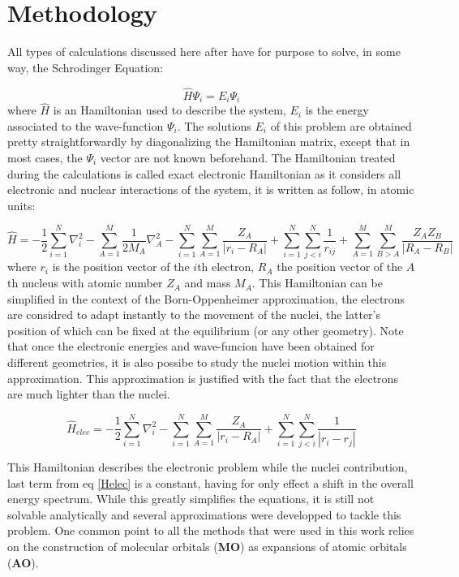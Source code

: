\documentclass[10pt]{report}
\numberwithin{equation}{section}
\begin{document}
\section{Methodology}

All types of calculations discussed here after have for purpose to solve, in some way, the Schrodinger Equation:

\begin{equation}
    \hat{H}\Psi_i=E_i\Psi_i
\end{equation}
where $\hat{H}$ is an Hamiltonian used to describe the system, $E_i$ is the energy associated to the wave-function $\Psi_i$. 
The solutions $E_i$ of this problem are obtained pretty straightforwardly by diagonalizing the Hamiltonian matrix, except that in most cases, the $\Psi_i$ vector are not known beforehand.
The Hamiltonian treated during the calculations is called exact electronic Hamiltonian as it considers all electronic and nuclear interactions of the system, it is written as follow, in atomic units:

\begin{equation}\label{Helec}
    \hat{H}=-\frac{1}{2}\sum_{i=1}^{N}\nabla_i^2-\sum_{A=1}^{M}\frac{1}{2M_A}\nabla_A^2%
    -\sum_{i=1}^{N}\sum_{A=1}^{M}\frac{Z_A}{|r_i-R_A|}+\sum_{i=1}^{N}\sum_{j<i}^{N}\frac{1}{r_{ij}}%
    +\sum_{A=1}^{M}\sum_{B>A}^{M}\frac{Z_A Z_B}{|R_A-R_B|}
\end{equation}
where $r_i$ is the position vector of the $i$th electron, $R_A$ the position vector of the $A$th nucleus with atomic number $Z_A$ and mass $M_A$.
This Hamiltonian can be simplified in the context of the Born-Oppenheimer approximation, the electrons are considred to adapt instantly to the movement of the nuclei, the latter's position of which can be fixed at the equilibrium (or any other geometry).
Note that once the electronic energies and wave-funcion have been obtained for different geometries, it is also possibe to study the nuclei motion within this approximation.
This approximation is justified with the fact that the electrons are much lighter than the nuclei. 

\begin{equation}\label{HBO}
    \hat{H}_{elec}=-\frac{1}{2}\sum_{i=1}^{N}\nabla_i^2%
    -\sum_{i=1}^{N}\sum_{A=1}^{M}\frac{Z_A}{|r_i-R_A|}+\sum_{i=1}^{N}\sum_{j<i}^{N}\frac{1}{|r_i-r_j|}%
\end{equation}

This Hamiltonian describes the electronic problem while the nuclei contribution, last term from eq \ref{Helec} is a constant, having for only effect a shift in the overall energy spectrum. 
While this greatly simplifies the equations, it is still not solvable analytically and several approximations were developped to tackle this problem. %
One common point to all the methods that were used in this work relies on the construction of molecular orbitals (\textbf{MO}) as expansions of atomic orbitals (\textbf{AO}).
\end{document}
